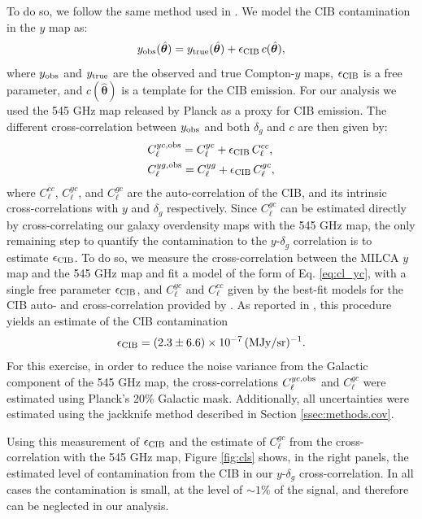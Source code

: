 \documentclass[useAMS,usenatbib]{mn2e}
\newcommand{\nv}{\hat{\boldsymbol{\theta}}}
\begin{document}
      To do so, we follow the same method used in \cite{2017MNRAS.467.2315V}. We model the CIB contamination in the $y$ map as:
      \begin{equation}
        y_{\rm obs}(\nv)=y_{\rm true}(\nv)+\epsilon_{\rm CIB}\,c(\nv),
      \end{equation}
      where $y_{\rm obs}$ and $y_{\rm true}$ are the observed and true Compton-$y$ maps, $\epsilon_{\rm CIB}$ is a free parameter, and $c(\nv)$ is a template for the CIB emission. For our analysis we used the 545 GHz map released by Planck as a proxy for CIB emission. The different cross-correlation between $y_{\rm obs}$ and both $\delta_g$ and $c$ are then given by:
      \begin{align}\label{eq:cl_yc}
        &C^{yc,{\rm obs}}_\ell= C^{yc}_\ell+\epsilon_{\rm CIB}\,C^{cc}_\ell,\\
        &C^{yg,{\rm obs}}_\ell= C^{yg}_\ell+\epsilon_{\rm CIB}\,C^{gc}_\ell,
      \end{align}
      where $C^{cc}_\ell$, $C^{yc}_\ell$,  and  $C^{gc}_\ell$ are the auto-correlation of the CIB, and its intrinsic cross-correlations with $y$ and $\delta_g$ respectively. Since $C^{gc}_\ell$ can be estimated directly by cross-correlating our galaxy overdensity maps with the 545 GHz map, the only remaining step to quantify the contamination to the $y$-$\delta_g$ correlation is to estimate $\epsilon_{\rm CIB}$. To do so, we measure the cross-correlation between the MILCA $y$ map and the 545 GHz map and fit a model of the form of Eq. \ref{eq:cl_yc}, with a single free parameter $\epsilon_{\rm CIB}$, and $C^{yc}_\ell$ and $C^{cc}_\ell$ given by the best-fit models for the CIB auto- and cross-correlation provided by \cite{2014A&A...571A..30P,2016A&A...594A..23P}. As reported in \cite{2018PhRvD..97f3514A}, this procedure yields an estimate of the CIB contamination
      \begin{equation}
        \epsilon_{\rm CIB}=(2.3\pm6.6)\times10^{-7}\,({\rm MJy}/{\rm sr})^{-1}.
      \end{equation}
      For this exercise, in order to reduce the noise variance from the Galactic component of the 545 GHz map, the cross-correlations $C^{yc,{\rm obs}}_\ell$ and $C^{gc}_\ell$ were estimated using Planck's 20\% Galactic mask. Additionally, all uncertainties were estimated using the jackknife method described in Section \ref{ssec:methods.cov}.
      
      Using this measurement of $\epsilon_{\rm CIB}$ and the estimate of $C^{gc}_\ell$ from the cross-correlation with the 545 GHz map, Figure \ref{fig:cls} shows, in the right panels, the estimated level of contamination from the CIB in our $y$-$\delta_g$ cross-correlation. In all cases the contamination is small, at the level of $\sim1\%$ of the signal, and therefore can be neglected in our analysis.
\end{document}

